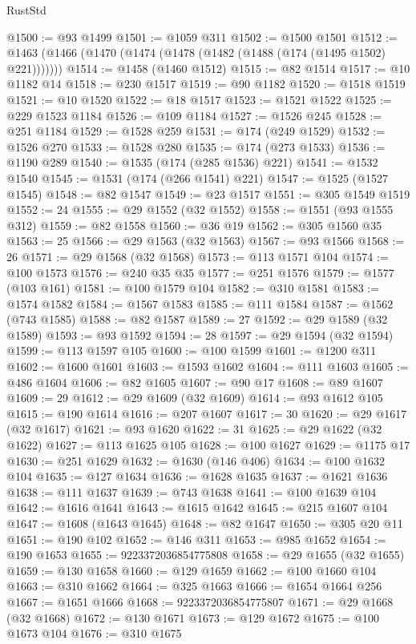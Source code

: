 \begin{lexlean}{RustStd}
\begin{coremodule}
{\begin{coremodule}
{{{{{{{{{{{{{{{{{{{{{{{{{{{{{{{{{{{{{{{{{{{{{{{{{{{{{{{@1500 := @93 @1499
@1501 := @1059 @311
@1502 := @1500 @1501
@1512 := @1463 (@1466 (@1470 (@1474 (@1478 (@1482 (@1488 (@174 (@1495 @1502) @221)))))))
@1514 := @1458 (@1460 @1512)
@1515 := @82 @1514
@1517 := @10 @1182 @14
@1518 := @230 @1517
@1519 := @90 @1182
@1520 := @1518 @1519
@1521 := @10 @1520
@1522 := @18 @1517
@1523 := @1521 @1522
@1525 := @229 @1523 @1184
@1526 := @109 @1184
@1527 := @1526 @245
@1528 := @251 @1184
@1529 := @1528 @259
@1531 := @174 (@249 @1529)
@1532 := @1526 @270
@1533 := @1528 @280
@1535 := @174 (@273 @1533)
@1536 := @1190 @289
@1540 := @1535 (@174 (@285 @1536) @221)
@1541 := @1532 @1540
@1545 := @1531 (@174 (@266 @1541) @221)
@1547 := @1525 (@1527 @1545)
@1548 := @82 @1547
@1549 := @23 @1517
@1551 := @305 @1549 @1519
@1552 := 24
@1555 := @29 @1552 (@32 @1552)
@1558 := @1551 (@93 @1555 @312)
@1559 := @82 @1558
@1560 := @36 @19
@1562 := @305 @1560 @35
@1563 := 25
@1566 := @29 @1563 (@32 @1563)
@1567 := @93 @1566
@1568 := 26
@1571 := @29 @1568 (@32 @1568)
@1573 := @113 @1571 @104
@1574 := @100 @1573
@1576 := @240 @35 @35
@1577 := @251 @1576
@1579 := @1577 (@103 @161)
@1581 := @100 @1579 @104
@1582 := @310 @1581
@1583 := @1574 @1582
@1584 := @1567 @1583
@1585 := @111 @1584
@1587 := @1562 (@743 @1585)
@1588 := @82 @1587
@1589 := 27
@1592 := @29 @1589 (@32 @1589)
@1593 := @93 @1592
@1594 := 28
@1597 := @29 @1594 (@32 @1594)
@1599 := @113 @1597 @105
@1600 := @100 @1599
@1601 := @1200 @311
@1602 := @1600 @1601
@1603 := @1593 @1602
@1604 := @111 @1603
@1605 := @486 @1604
@1606 := @82 @1605
@1607 := @90 @17
@1608 := @89 @1607
@1609 := 29
@1612 := @29 @1609 (@32 @1609)
@1614 := @93 @1612 @105
@1615 := @190 @1614
@1616 := @207 @1607
@1617 := 30
@1620 := @29 @1617 (@32 @1617)
@1621 := @93 @1620
@1622 := 31
@1625 := @29 @1622 (@32 @1622)
@1627 := @113 @1625 @105
@1628 := @100 @1627
@1629 := @1175 @17
@1630 := @251 @1629
@1632 := @1630 (@146 @406)
@1634 := @100 @1632 @104
@1635 := @127 @1634
@1636 := @1628 @1635
@1637 := @1621 @1636
@1638 := @111 @1637
@1639 := @743 @1638
@1641 := @100 @1639 @104
@1642 := @1616 @1641
@1643 := @1615 @1642
@1645 := @215 @1607 @104
@1647 := @1608 (@1643 @1645)
@1648 := @82 @1647
@1650 := @305 @20 @11
@1651 := @190 @102
@1652 := @146 @311
@1653 := @985 @1652
@1654 := @190 @1653
@1655 := 9223372036854775808
@1658 := @29 @1655 (@32 @1655)
@1659 := @130 @1658
@1660 := @129 @1659
@1662 := @100 @1660 @104
@1663 := @310 @1662
@1664 := @325 @1663
@1666 := @1654 @1664 @256
@1667 := @1651 @1666
@1668 := 9223372036854775807
@1671 := @29 @1668 (@32 @1668)
@1672 := @130 @1671
@1673 := @129 @1672
@1675 := @100 @1673 @104
@1676 := @310 @1675
}}}}}}}}}}}}}}}}}}}}}}}}}}}}}}}}}}}}}}}}}}}}}}}}}}}}}}}
\end{coremodule}}
\end{coremodule}
\end{lexlean}
